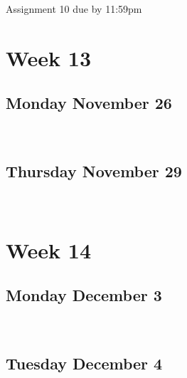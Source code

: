 \documentclass[]{book}
\let\originaltabular\tabular
\let\endoriginaltabular\endtabular
\renewenvironment{tabular}[1]{%
  \begingroup%
  \centering%
  \originaltabular{#1}}%
  {\endoriginaltabular\endgroup}
\theoremstyle{definition}
\theoremstyle{definition}
\theoremstyle{definition}
\theoremstyle{remark}
\begin{document}
\begin{table}[H]
\centering
\begin{tabular}{l}
\hline
Assignment 10 due by 11:59pm\\
\hline
\end{tabular}
\end{table}

\section{Week 13}\label{week-13}

\subsection{Monday November 26}\label{monday-november-26}

\begin{table}[H]
\centering
\begin{tabular}{l}
\hline
\\
\hline
\end{tabular}
\end{table}

\subsection{Thursday November 29}\label{thursday-november-29}

\begin{table}[H]
\centering
\begin{tabular}{l}
\hline
\\
\hline
\end{tabular}
\end{table}

\section{Week 14}\label{week-14}

\subsection{Monday December 3}\label{monday-december-3}

\begin{table}[H]
\centering
\begin{tabular}{l}
\hline
\\
\hline
\end{tabular}
\end{table}

\subsection{Tuesday December 4}\label{tuesday-december-4}
\end{document}
